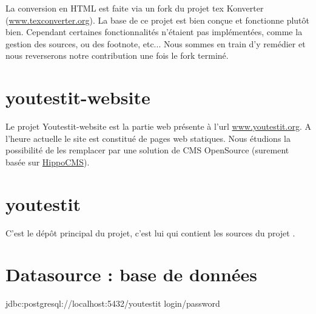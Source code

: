 La conversion en HTML est faite via un fork du projet tex Konverter (\href{http://www.texconverter.org}{www.texconverter.org}). La base de ce projet est bien
conçue et fonctionne plutôt bien. Cependant certaines fonctionnalités n'étaient pas implémentées,
comme la gestion des sources, ou des footnote, etc... Nous sommes en train d'y remédier et nous
reverserons notre contribution une fois le fork terminé. 

\section{youtestit-website}	
Le projet Youtestit-website est la partie web présente à l'url \href{http://www.youtestit.org}{www.youtestit.org}.
A l'heure actuelle le site est constitué de pages web statiques. Nous étudions la possibilité de les
remplacer par une solution de CMS OpenSource (surement basée sur \href{http://www.onehippo.com/en/products/cms}{HippoCMS}). 



\section{youtestit}
C'est le dépôt principal du projet, c'est lui qui contient les sources du projet \youTestIt{}. 



\section{Datasource : base de données}







jdbc:postgresql://localhost:5432/youtestit
login/password
